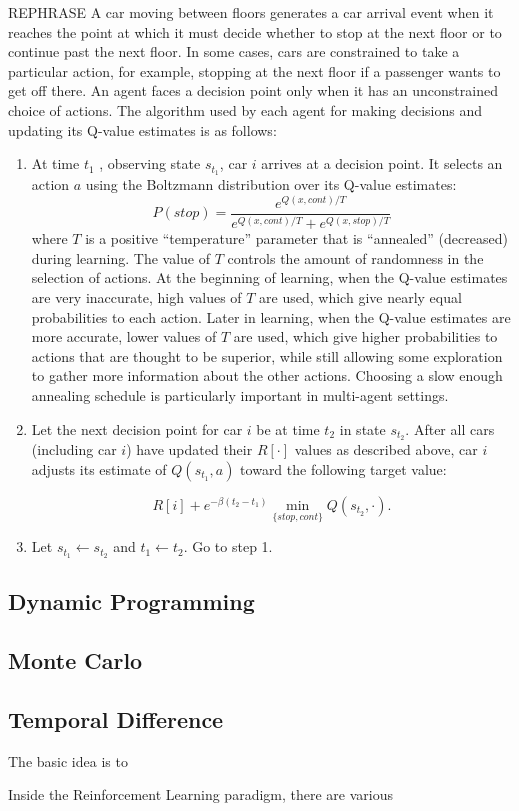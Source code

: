 {\color{red} REPHRASE}
A car moving between floors generates a car arrival event when it reaches the point at which it must decide whether to stop at the next floor or to continue past the next floor. In some cases, cars are constrained to take a particular action, for example, stopping at the next floor if a passenger wants to get off there. An agent faces a decision point only when it has an unconstrained choice of actions. The algorithm used by each agent for making decisions and updating its Q-value estimates is as follows:
\begin{enumerate}
    \item At time $t_1$ , observing state $s_{t_1}$, car $i$ arrives at a decision point. It selects an action $a$ using the Boltzmann distribution over its Q-value estimates:
    \[
        P(stop) = \frac{e^{Q(x,cont)/T}}{e^{Q(x,cont)/T} + e^{Q(x,stop)/T}}
    \]
    where $T$ is a positive “temperature” parameter that is “annealed” (decreased) during learning. The value of $T$ controls the amount of randomness in the selection of actions. At the beginning of learning, when the Q-value estimates are very inaccurate, high values of $T$ are used, which give nearly equal probabilities to each action. Later in learning, when the Q-value estimates are more accurate, lower values of $T$ are used, which give higher probabilities to actions that are thought to be superior, while still allowing some exploration to gather more information about the other actions. Choosing a slow enough annealing schedule is particularly
    important in multi-agent settings.
    
    \item Let the next decision point for car $i$ be at time $t_2$ in state $s_{t_2}$. After all cars (including car $i$) have updated their $R[\cdot]$ values as described above, car $i$ adjusts its estimate of $Q(s_{t_1}, a)$ toward the following target value:

    \[
    R[i] + e^{-\beta(t_2 - t_1)} \min\limits_{\{stop, cont\}} Q(s_{t_2}, \cdot).    
    \]

    \item
    Let $s_{t_1} \leftarrow s_{t_2}$ and $t_1 \leftarrow t_2$. Go to step 1.

\end{enumerate}



\subsection{Dynamic Programming}

\subsection{Monte Carlo}

\subsection{Temporal Difference}

The basic idea is to 


Inside the Reinforcement Learning paradigm, there are various 